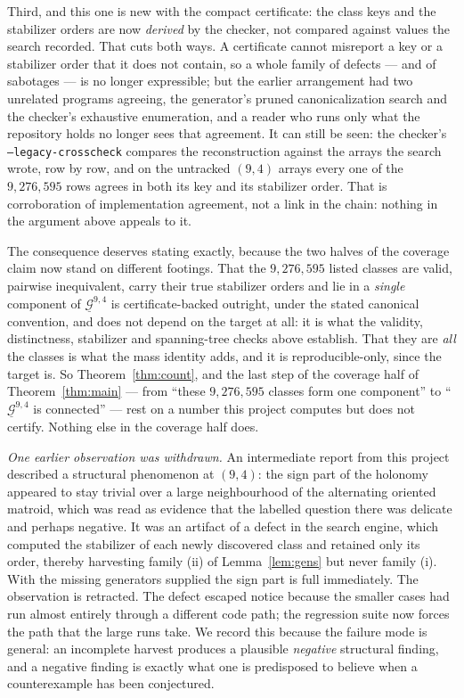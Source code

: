 \documentclass[11pt]{amsart}
\theoremstyle{remark}
\newcommand{\Gu}{\underline{\mathcal{G}}}
\begin{document}
Third, and this one is new with the compact certificate: the class keys
and the stabilizer orders are now \emph{derived} by the checker, not
compared against values the search recorded. That cuts both ways. A
certificate cannot misreport a key or a stabilizer order that it does not
contain, so a whole family of defects --- and of sabotages --- is no
longer expressible; but the earlier arrangement had two unrelated programs
agreeing, the generator's pruned canonicalization search and the checker's
exhaustive enumeration, and a reader who runs only what the repository
holds no longer sees that agreement. It can still be seen: the checker's
\texttt{--legacy-crosscheck} compares the reconstruction against the
arrays the search wrote, row by row, and on the untracked
$(9,4)$ arrays every one of the $9{,}276{,}595$ rows agrees in both its key
and its stabilizer order. That is corroboration of implementation agreement,
not a link in the chain: nothing in the argument above appeals to it.

The consequence deserves stating exactly, because the two halves of the
coverage claim now stand on different footings. That the $9{,}276{,}595$
listed classes are valid, pairwise inequivalent, carry their true
stabilizer orders and lie in a \emph{single} component of $\Gu^{9,4}$ is
certificate-backed outright, under the stated canonical convention, and
does not depend on the target at all: it is what the validity,
distinctness, stabilizer and spanning-tree checks above establish. That
they are \emph{all} the classes
is what the mass identity adds, and it is reproducible-only, since the
target is. So Theorem~\ref{thm:count}, and the last step of the coverage
half of Theorem~\ref{thm:main} --- from ``these $9{,}276{,}595$ classes
form one component'' to ``$\Gu^{9,4}$ is connected'' --- rest on a number
this project computes but does not certify. Nothing else in the coverage
half does.

\emph{One earlier observation was withdrawn.} An intermediate report from
this project described a structural phenomenon at $(9,4)$: the sign part
of the holonomy appeared to stay trivial over a large neighbourhood of
the alternating oriented matroid, which was read as evidence that the
labelled question there was delicate and perhaps negative. It was an
artifact of a defect in the search engine, which computed the stabilizer
of each newly discovered class and retained only its order, thereby
harvesting family (ii) of Lemma~\ref{lem:gens} but never family (i). With
the missing generators supplied the sign part is full immediately. The
observation is retracted. The defect escaped notice because the smaller
cases had run almost entirely through a different code path; the
regression suite now forces the path that the large runs take. We record
this because the failure mode is general: an incomplete harvest produces
a plausible \emph{negative} structural finding, and a negative finding is
exactly what one is predisposed to believe when a counterexample has been
conjectured.
\end{document}
